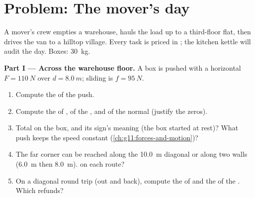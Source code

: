 \section{Problem: The mover's day}

\begin{problem}
\label{pb:g11:work-of-force:1}
A mover's crew empties a warehouse, hauls the load up to a third-floor
flat, then drives the van to a hilltop village. Every task is priced
in ; the kitchen kettle will audit the day. Boxes: \qty{30}{kg}.

\medskip
\noindent\textbf{Part I --- Across the warehouse floor.}
A box is pushed with a horizontal  $F = \qty{110}{N}$ over
$d = \qty{8.0}{m}$; sliding  is $f = \qty{95}{N}$.
\begin{enumerate}
  \item Compute the  of the push.
  \item Compute the  of , of the , and of the normal
         (justify the zeros).
  \item Total  on the box, and its sign's meaning (the box started
        at rest)? What push keeps the speed constant
        (\cref{ch:g11:forces-and-motion})?
  \item The far corner can be reached along the \qty{10.0}{m} diagonal
        or along two walls (\qty{6.0}{m} then \qty{8.0}{m}). 
         on each route?
  \item On a diagonal round trip (out and back), compute the  of
         and the  of the . Which  refunds?
\end{enumerate}


\end{problem}
